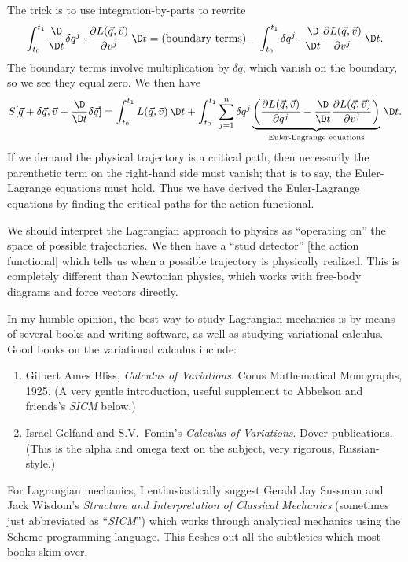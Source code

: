 The trick is to use integration-by-parts to rewrite
\begin{equation}
 \int^{t_{1}}_{t_{0}}
  \frac{\D}{\D t}\delta q^{j}\cdot \frac{\partial L(\vec{q},\vec{v})}{\partial v^{j}}\,\D t
  = (\mbox{boundary terms}) -
  \int^{t_{1}}_{t_{0}}
  \delta q^{j}\cdot \frac{\D}{\D t}\frac{\partial L(\vec{q},\vec{v})}{\partial v^{j}}\,\D t.
\end{equation}
The boundary terms involve multiplication by $\delta q$, which vanish on
the boundary, so we see they equal zero. We then have
\begin{equation}
S[\vec{q} + \delta\vec{q}, \vec{v} + \frac{\D}{\D t}\delta\vec{q}]
=\int^{t_{1}}_{t_{0}}L(\vec{q},\vec{v})\,\D t +
\int^{t_{1}}_{t_{0}}\sum^{n}_{j=1}\delta q^{j}\underbrace{\left(\frac{\partial L(\vec{q},\vec{v})}{\partial q^{j}}
-\frac{\D}{\D t}\frac{\partial L(\vec{q},\vec{v})}{\partial v^{j}}
\right)}_{\text{Euler-Lagrange equations}}\,\D t.
\end{equation}
If we demand the physical trajectory is a critical path, then
necessarily the parenthetic term on the right-hand side must vanish;
that is to say, the Euler-Lagrange equations must hold.
Thus we have derived the Euler-Lagrange equations by finding the
critical paths for the action functional.

We should interpret the Lagrangian approach to physics as ``operating
on'' the space of possible trajectories. We then have a ``stud detector''
[the action functional] which tells us when a possible trajectory is
physically realized. This is completely different than Newtonian
physics, which works with free-body diagrams and force vectors directly.

In my humble opinion, the best way to study Lagrangian mechanics is by
means of several books and writing software, as well as studying
variational calculus. Good books on the variational calculus include:
\begin{enumerate}
\item Gilbert Ames Bliss, \emph{Calculus of Variations}. Corus
  Mathematical Monographs, 1925. (A very gentle introduction, useful
  supplement to Abbelson and friends's \emph{SICM} below.)
\item Israel Gelfand and S.V.~Fomin's
  \emph{Calculus of Variations}. Dover publications. (This is the alpha
  and omega text on the subject, very rigorous, Russian-style.)
\end{enumerate}
For Lagrangian mechanics, I enthusiastically suggest
Gerald Jay Sussman and Jack Wisdom's \emph{Structure and Interpretation of Classical Mechanics}
(sometimes just abbreviated as ``\emph{SICM}'')
which works through analytical mechanics using the Scheme programming
language. This fleshes out all the subtleties which most books skim
over.

